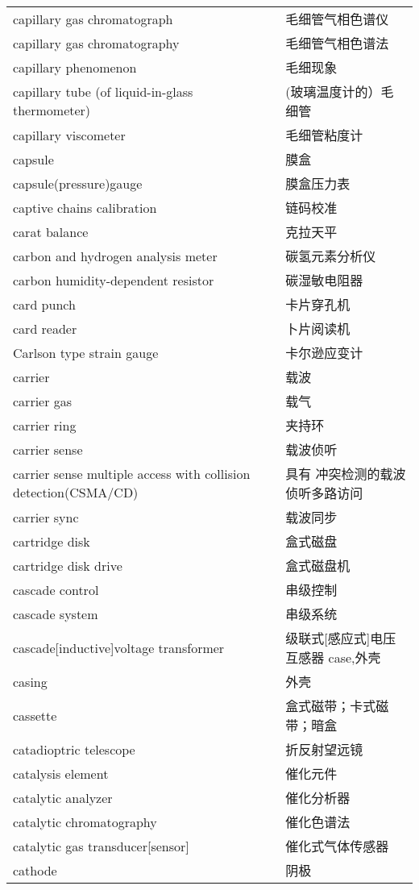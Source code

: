 \documentclass[
]{article}
\begin{document}
\begin{longtable}[]{@{}ll@{}}
capillary gas chromatograph & 毛细管气相色谱仪 \\
capillary gas chromatography & 毛细管气相色谱法 \\
capillary phenomenon & 毛细现象 \\
capillary tube (of liquid-in-glass thermometer) &
(玻璃温度计的）毛细管 \\
capillary viscometer & 毛细管粘度计 \\
capsule & 膜盒 \\
capsule(pressure)gauge & 膜盒压力表 \\
captive chains calibration & 链码校准 \\
carat balance & 克拉天平 \\
carbon and hydrogen analysis meter & 碳氢元素分析仪 \\
carbon humidity-dependent resistor & 碳湿敏电阻器 \\
card punch & 卡片穿孔机 \\
card reader & 卜片阅读机 \\
Carlson type strain gauge & 卡尔逊应变计 \\
carrier & 载波 \\
carrier gas & 载气 \\
carrier ring & 夹持环 \\
carrier sense & 载波侦听 \\
carrier sense multiple access with collision detection(CSMA/CD) & 具有
冲突检测的载波侦听多路访问 \\
carrier sync & 载波同步 \\
cartridge disk & 盒式磁盘 \\
cartridge disk drive & 盒式磁盘机 \\
cascade control & 串级控制 \\
cascade system & 串级系统 \\
cascade{[}inductive{]}voltage transformer & 级联式{[}感应式{]}电压互感器
case,外壳 \\
casing & 外壳 \\
cassette & 盒式磁带；卡式磁 带；暗盒 \\
catadioptric telescope & 折反射望远镜 \\
catalysis element & 催化元件 \\
catalytic analyzer & 催化分析器 \\
catalytic chromatography & 催化色谱法 \\
catalytic gas transducer{[}sensor{]} & 催化式气体传感器 \\
cathode & 阴极 \\

\end{longtable}
\end{document}
